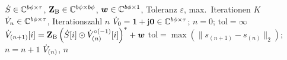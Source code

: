 \begin{algorithm}[H]
	\caption{Tensor Power Flow. Dense-Formulierung nach \cite{Salazar2024}}
	\label{alg:tpf_dense}
	\begin{algorithmic}[1]
		\REQUIRE $\dot{S} \in \mathbb{C}^{b\phi \times \tau}$, $\mathbf{Z}_\mathrm{B} \in \mathbb{C}^{b\phi \times b\phi}$, $\boldsymbol{w} \in \mathbb{C}^{b\phi \times 1}$, Toleranz $\varepsilon$, max.\ Iterationen $K$
		\ENSURE $\dot{V}_n \in \mathbb{C}^{b\phi \times \tau}$, Iterationszahl $n$
		\STATE $\dot{V}_0 = \mathbf{1} + \mathrm{j}\mathbf{0} \in \mathbb{C}^{b\phi \times \tau}$; \quad $n = 0$; \quad $\text{tol} = \infty$
		\STATE $\dot{V}_{(n+1)}[i] = \mathbf{Z}_\mathrm{B} \left(\dot{S}[i] \odot \dot{V}_{(n)}^{{\circ(-1)}}[i]\right)^* + \boldsymbol{w}$
		\ENDFOR
		\STATE $\text{tol} = \max\left(\|s_{(n+1)} - s_{(n)}\|_2\right)$; \quad $n = n + 1$
		\ENDWHILE
		\RETURN $\dot{V}_{(n)}$, $n$
	\end{algorithmic}
\end{algorithm}



